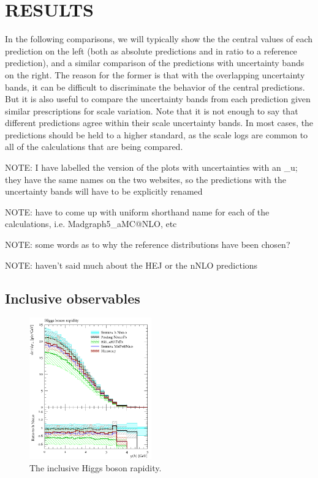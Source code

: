 \section{RESULTS}
\label{sec:hjetscomp:results}

In the following comparisons, we will typically show the the central
values of each prediction on the left (both as absolute predictions
and in ratio to a reference prediction), and a similar comparison of
the predictions with uncertainty bands on the right. The reason for
the former is that with the overlapping uncertainty bands, it can be
difficult to discriminate the behavior of the central predictions. But
it is also useful to compare the uncertainty bands from each
prediction given similar prescriptions for scale variation.  Note that
it is not enough to say that different predictions agree within their
scale uncertainty bands. In most cases, the predictions should be held
to a higher standard, as the scale logs are common to all of the
calculations that are being compared.

NOTE: I have labelled the version of the plots with uncertainties with
an \_u; they have the same names on the two websites, so the
predictions with the uncertainty bands will have to be explicitly
renamed

NOTE: have to come up with uniform shorthand name for each of the
calculations, i.e. Madgraph5\_aMC@NLO, etc

NOTE: some words as to why the reference distributions have been chosen?

NOTE: haven't said much about the HEJ or the nNLO predictions

\subsection{Inclusive observables}
\label{sec:hjetscomp:results:inclobs}

\begin{figure}[t!]
  \centering
  \includegraphics[width=0.47\textwidth]{figures/hjetscomp_H_y.pdf}
  \caption{
    The inclusive Higgs boson rapidity.
    \label{fig:higgscomp:results:inclobs:hy}
  }
\end{figure}

